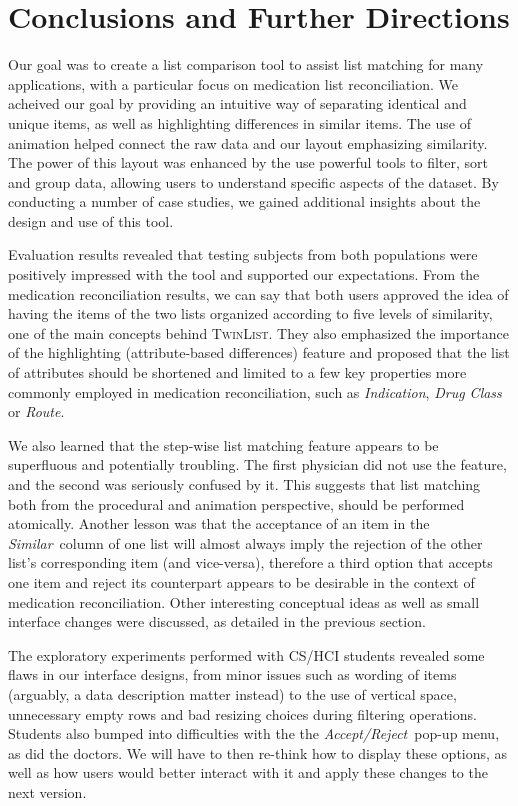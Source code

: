 \documentclass{chi2009}
\newcommand{\TwinList}{\textsc{TwinList}}
\newcommand{\AcceptReject}{\textit{Accept/Reject}}
\newcommand{\Similar}{\textit{Similar}}
\begin{document}
\section{Conclusions and Further Directions}
Our goal was to create a list comparison tool to assist list matching for many applications, with a particular focus on medication list reconciliation. We acheived our goal by providing an intuitive way of separating identical and unique items, as well as highlighting differences in similar items. The use of animation helped connect the raw data and our layout emphasizing similarity. The power of this layout was enhanced by the use powerful tools to filter, sort and group data, allowing users to understand specific aspects of the dataset. By conducting a number of case studies, we gained additional insights about the design and use of this tool.

Evaluation results revealed that testing subjects from both populations were positively impressed with the tool and supported our expectations. From the medication reconciliation results, we can say that both users approved the idea of having the items of the two lists organized according to five levels of similarity, one of the main concepts behind \TwinList. They also emphasized the importance of the highlighting (attribute-based differences) feature and proposed that the list of attributes should be shortened and limited to a few key properties more commonly employed in medication reconciliation, such as \textit{Indication}, \textit{Drug Class} or \textit{Route}. 

We also learned that the step-wise list matching feature appears to be superfluous and potentially troubling. The first physician did not use the feature, and the second was seriously confused by it. This suggests that list matching both from the procedural and animation perspective, should be performed atomically. Another lesson was that the acceptance of an item in the \Similar~column of one list will almost always imply the rejection of the other list's corresponding item (and vice-versa), therefore a third option that accepts one item and reject its counterpart appears to be desirable in the context of medication reconciliation. Other interesting conceptual ideas as well as small interface changes were discussed, as detailed in the previous section.

The exploratory experiments performed with CS/HCI students revealed some flaws in our interface designs, from minor issues such as wording of items (arguably, a data description matter instead) to the use of vertical space, unnecessary empty rows and bad resizing choices during filtering operations. Students also bumped into difficulties with the the \AcceptReject~pop-up menu, as did the doctors. We will have to then re-think how to display these options, as well as how users would better interact with it and apply these changes to the next version.
 



\end{document}
